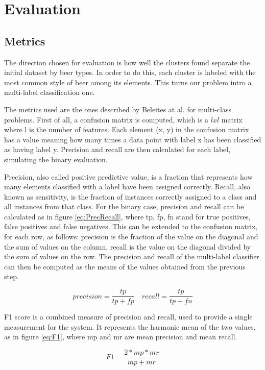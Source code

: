 \documentclass[12pt]{article}
\begin{document}
	\section{Evaluation}
	\subsection{Metrics}
	The direction chosen for evaluation is how well the clusters found separate the initial dataset by beer types. In order to do this, each cluster is labeled with the most common style of beer among its elements. This turns our problem intro a multi-label classification one.
	
	The metrics used are the ones described by Beleites at al.\cite{MultilabelClassification} for multi-class problems. First of all, a confusion matrix is computed, which is a \(lxl\) matrix where l is the number of features. Each element (x, y) in the confusion matrix has a value meaning how many times a data point with label x has been classified as having label y. Precision and recall are then calculated for each label, simulating the binary evaluation. 
	
	Precision, also called positive predictive value, is a fraction that represents how many elements classified with a label have been assigned correctly. Recall, also known as sensitivity, is the fraction of instances correctly assigned to a class and all instances from that class. For the binary case, precision and recall can be calculated as in figure \ref{eq:PrecRecall}, where tp, fp, fn stand for true positives, false positives and false negatives. This can be extended to the confusion matrix, for each row, as follows: precision is the fraction of the value on the diagonal and the sum of values on the column, recall is the value on the diagonal divided by the sum of values on the row. The precision and recall of the multi-label classifier can then be computed as the means of the values obtained from the previous step.
	
	\begin{equation}
	\label{eq:PrecRecall}
	precision = \frac{tp}{tp + fp} \quad recall = \frac{tp}{tp + fn}
	\end{equation}
	
	F1 score is a combined measure of precision and recall, used to provide a single measurement for the system. It represents the harmonic mean of the two values, as in figure \ref{eq:F1}, where mp and mr are mean precision and mean recall.
	
	\begin{equation}
	\label{eq:F1}
	F1 = \frac{2 * mp * mr}{mp + mr}
	\end{equation}
	
\end{document}
